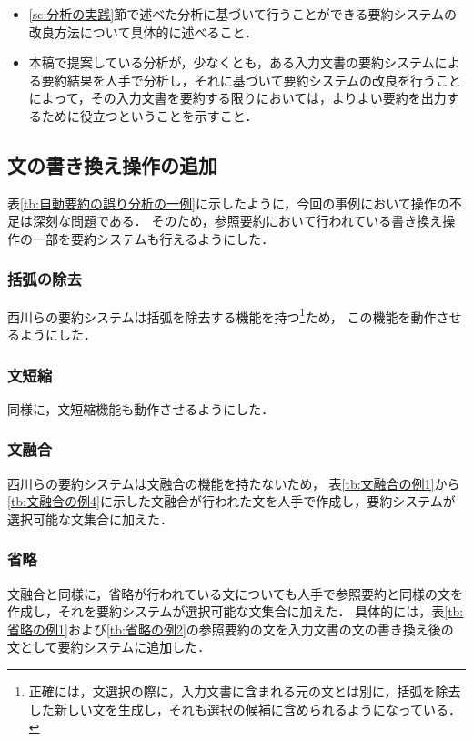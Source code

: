 \begin{itemize}
\item
\ref{sc:分析の実践}節で述べた分析に基づいて行うことができる要約システムの改良方法について具体的に述べること．
\item
本稿で提案している分析が，少なくとも，ある入力文書の要約システムによる要約結果を人手で分析し，それに基づいて要約システムの改良を行うことによって，その入力文書を要約する限りにおいては，よりよい要約を出力するために役立つということを示すこと．
\end{itemize}


\subsection{文の書き換え操作の追加}
\label{sc:文の書き換え操作の追加}

表\ref{tb:自動要約の誤り分析の一例}に示したように，今回の事例において操作の不足は深刻な問題である．
そのため，参照要約において行われている書き換え操作の一部を要約システムも行えるようにした．


\subsubsection{括弧の除去}

西川らの要約システムは括弧を除去する機能を持つ\footnote{
正確には，文選択の際に，入力文書に含まれる元の文とは別に，括弧を除去した新しい文を生成し，それも選択の候補に含められるようになっている．}ため，
この機能を動作させるようにした．


\subsubsection{文短縮}

同様に，文短縮機能も動作させるようにした．


\subsubsection{文融合}

西川らの要約システムは文融合の機能を持たないため，
表\ref{tb:文融合の例1}から\ref{tb:文融合の例4}に示した文融合が行われた文を人手で作成し，要約システムが選択可能な文集合に加えた．


\subsubsection{省略}

文融合と同様に，省略が行われている文についても人手で参照要約と同様の文を作成し，それを要約システムが選択可能な文集合に加えた．
具体的には，表\ref{tb:省略の例1}および\ref{tb:省略の例2}の参照要約の文を入力文書の文の書き換え後の文として要約システムに追加した．


